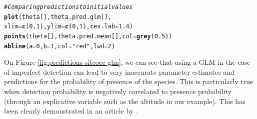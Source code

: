 \documentclass[a4paper, 12pt, leqno]{article}\usepackage[]{graphicx}\usepackage[]{color}
\makeatletter
\newcommand{\hlnum}[1]{\textcolor[rgb]{0.686,0.059,0.569}{#1}}%
\newcommand{\hlstr}[1]{\textcolor[rgb]{0.192,0.494,0.8}{#1}}%
\newcommand{\hlcom}[1]{\textcolor[rgb]{0.678,0.584,0.686}{\textit{#1}}}%
\newcommand{\hlstd}[1]{\textcolor[rgb]{0.345,0.345,0.345}{#1}}%
\newcommand{\hlkwc}[1]{\textcolor[rgb]{0.333,0.667,0.333}{#1}}%
\newcommand{\hlkwd}[1]{\textcolor[rgb]{0.737,0.353,0.396}{\textbf{#1}}}%
\newenvironment{kframe}{%
 \def\at@end@of@kframe{}%
 \ifinner\ifhmode%
  \def\at@end@of@kframe{\end{minipage}}%
  \begin{minipage}{\columnwidth}%
 \fi\fi%
 \def\FrameCommand##1{\hskip\@totalleftmargin \hskip-\fboxsep
 \colorbox{shadecolor}{##1}\hskip-\fboxsep
     \hskip-\linewidth \hskip-\@totalleftmargin \hskip\columnwidth}%
 \MakeFramed {\advance\hsize-\width
   \@totalleftmargin\z@ \linewidth\hsize
   \@setminipage}}%
 {\par\unskip\endMakeFramed%
 \at@end@of@kframe}
\newenvironment{knitrout}{}{} %
\makeatother
\begin{document}
\begin{knitrout}\small
{}\color{fgcolor}\begin{kframe}
\begin{alltt}
\hlcom{# Comparing predictions to initial values}
\hlkwd{plot}\hlstd{(theta[],theta.pred.glm[],}
     \hlkwc{xlim}\hlstd{=}\hlkwd{c}\hlstd{(}\hlnum{0}\hlstd{,}\hlnum{1}\hlstd{),}\hlkwc{ylim}\hlstd{=}\hlkwd{c}\hlstd{(}\hlnum{0}\hlstd{,}\hlnum{1}\hlstd{),}\hlkwc{cex.lab}\hlstd{=}\hlnum{1.4}\hlstd{)}
\hlkwd{points}\hlstd{(theta[],theta.pred.mean[],}\hlkwc{col}\hlstd{=}\hlkwd{grey}\hlstd{(}\hlnum{0.5}\hlstd{))}
\hlkwd{abline}\hlstd{(}\hlkwc{a}\hlstd{=}\hlnum{0}\hlstd{,}\hlkwc{b}\hlstd{=}\hlnum{1}\hlstd{,}\hlkwc{col}\hlstd{=}\hlstr{"red"}\hlstd{,}\hlkwc{lwd}\hlstd{=}\hlnum{2}\hlstd{)}
\end{alltt}
\end{kframe}
\end{knitrout}


On Figure \ref{fig:predictions-siteocc-glm}, we can see that using a GLM in the case of
imperfect detection can lead to very inaccurate parameter estimates and predictions for
the probability of presence of the species. This is particularly true when detection
probability is negatively correlated to presence probability (through an explicative
variable such as the altitude in our example). This has been clearly demonstrated in an
article by \citet{Lahoz-Monfort2014}.
\end{document}
